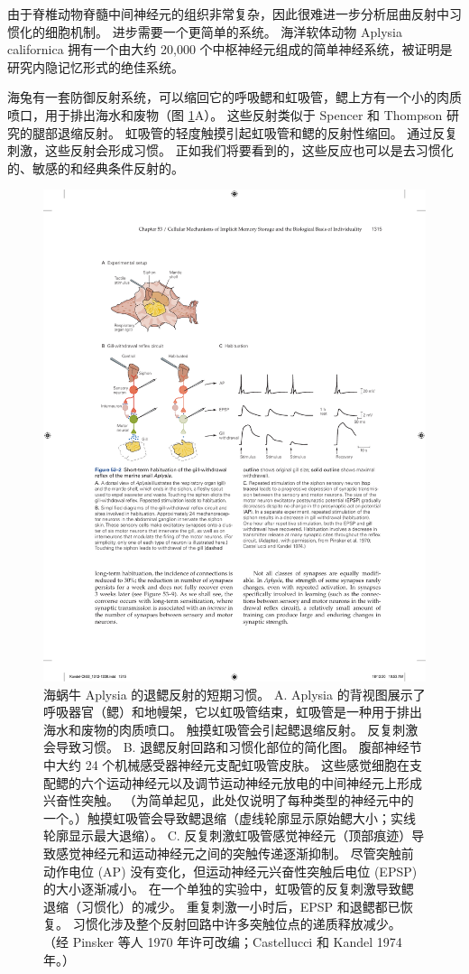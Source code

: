 由于脊椎动物脊髓中间神经元的组织非常复杂，因此很难进一步分析屈曲反射中习惯化的细胞机制。
进步需要一个更简单的系统。
海洋软体动物 Aplysia californica 拥有一个由大约 20,000 个中枢神经元组成的简单神经系统，被证明是研究内隐记忆形式的绝佳系统。


海兔有一套防御反射系统，可以缩回它的呼吸鳃和虹吸管，鳃上方有一个小的肉质喷口，用于排出海水和废物（图 \ref{fig:53_2}A）。
这些反射类似于 Spencer 和 Thompson 研究的腿部退缩反射。
虹吸管的轻度触摸引起虹吸管和鳃的反射性缩回。
通过反复刺激，这些反射会形成习惯。
正如我们将要看到的，这些反应也可以是去习惯化的、敏感的和经典条件反射的。


\begin{figure}[htbp]
	\centering
	\includegraphics[width=0.9\linewidth]{chap53/fig_53_2}
	\caption{海蜗牛 Aplysia 的退鳃反射的短期习惯。 A. Aplysia 的背视图展示了呼吸器官（鳃）和地幔架，它以虹吸管结束，虹吸管是一种用于排出海水和废物的肉质喷口。 触摸虹吸管会引起鳃退缩反射。 反复刺激会导致习惯。 B. 退鳃反射回路和习惯化部位的简化图。 腹部神经节中大约 24 个机械感受器神经元支配虹吸管皮肤。 这些感觉细胞在支配鳃的六个运动神经元以及调节运动神经元放电的中间神经元上形成兴奋性突触。 （为简单起见，此处仅说明了每种类型的神经元中的一个。）触摸虹吸管会导致鳃退缩（虚线轮廓显示原始鳃大小；实线轮廓显示最大退缩）。 C. 反复刺激虹吸管感觉神经元（顶部痕迹）导致感觉神经元和运动神经元之间的突触传递逐渐抑制。 尽管突触前动作电位 (AP) 没有变化，但运动神经元兴奋性突触后电位 (EPSP) 的大小逐渐减小。 在一个单独的实验中，虹吸管的反复刺激导致鳃退缩（习惯化）的减少。 重复刺激一小时后，EPSP 和退鳃都已恢复。 习惯化涉及整个反射回路中许多突触位点的递质释放减少。 （经 Pinsker 等人 1970 年许可改编；Castellucci 和 Kandel 1974 年。）}
	\label{fig:53_2}
\end{figure}


